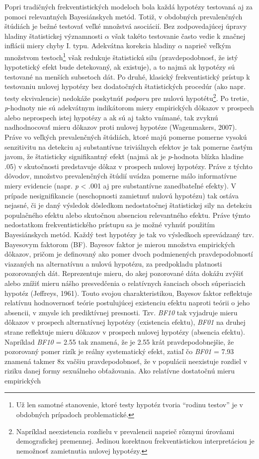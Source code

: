 \documentclass[
]{article}
\begin{document}
Popri tradičných frekventistických modeloch bola každá hypotézy testovaná aj za pomoci relevantných Bayesiánskych metód. Totiž, v obdobných prevalenčných štúdiách je bežné testovať veľké množstvá asociácií. Bez zodpovedajúcej úpravy hladiny štatistickej významnosti \(\alpha\) však takéto testovanie často vedie k značnej inflácii miery chyby I. typu. Adekvátna korekcia hladiny \(\alpha\) naprieč veľkým množstvom testoch\footnote{Už len samotné stanovenie, ktoré testy hypotéz tvoria ``rodinu testov'' je v obdobných prípadoch problematické.} však redukuje štatistickú silu (pravdepodobnosť, že istý hypotetický efekt bude detekovaný, ak existuje), a to najmä ak hypotézy sú testované na menších subsetoch dát. Po druhé, klasický frekventistický prístup k testovaniu nulovej hypotézy bez dodatočných štatistických procedúr (ako napr. testy ekvivalencie) nedokáže poskytnúť \emph{podporu} pre nulovú hypotétu\footnote{Napríklad neexistencia rozdielu v prevalencii naprieč rôznymi úrovňami demografickej premennej. Jedinou korektnou frekventistickou interpretáciou je nemožnosť zamietnutia nulovej hypotézy.}. Po tretie, \emph{p}-hodnoty nie sú adekvátnym indikátorom miery empirických dôkazov v prospech alebo neprospech istej hypotézy a ak sú aj takto vnímané, tak zvyknú nadhodnocovať mieru dôkazov proti nulovej hypotéze (Wagenmakers, 2007). Práve vo veľkých prevalenčných štúdiách, ktoré majú pomerne pomerne vysokú senzitivitu na detekciu aj substantívne triviálnych efektov je tak pomerne častým javom, že štatisticky signifikantný efekt (najmä ak je \emph{p}-hodnota blízka hladine .05) v skutočnosti predstavuje dôkaz v prospech nulovej hypotézy. Práve z týchto dôvodov, množstvo prevalenčných štúdií uvádza pomerne málo informatívne miery evidencie (napr. \emph{p} \textless{} .001 aj pre substantívne zanedbateľné efekty). V prípade nesignifikancie (neschopnosti zamietnuť nulovú hypotézu) tak ostáva nejasné, či je daný výsledok dôsledkom nedostatočnej štatistickej sily na detekciu populačného efektu alebo skutočnou absenciou relevantného efektu. Práve týmto nedostatkom frekventistického prístupu sa je možné vyhnúť použitím Bayesiánskych metód. Každý test hypotézy je tak vo výsledkoch sprevádzaný tzv. Bayesovym faktorom (BF). Bayesov faktor je mierou množstva empirických dôkazov, pričom je definovaný ako pomer dvoch podmienených pravdepodobností viazaných na alternatívnu a nulovú hypotézu, za predpokladu platnosti pozorovaných dát. Reprezentuje mieru, do akej pozorované dáta dokážu zvýšiť alebo znížiť mieru nášho presvedčenia o relatívnych šanciach oboch súperiacich hypotéz (Jeffreys, 1961). Touto svojou charakteristikou, Bayesov faktor reflektuje relatívnu hodnovernosť teórie postulujúcej existenciu efektu naproti teórii o jeho absencii, v zmysle ich prediktívnej presnosti. Tzv. \emph{BF10} tak vyjadruje mieru dôkazov v prospech alternatívnej hypotézy (existencia efektu), \emph{BF01} na druhej strane reflektuje mieru dôkazov v prospech nulovej hypotézy (absencia efektu). Napríklad \emph{BF10} = 2.55 tak znamená, že je 2.55 krát pravdepodobnejšie, že pozorovaný pomer rizík je reálny systematický efekt, zatiaľ čo \emph{BF01} = 7.93 znamená takmer 8x vačšiu pravdepodobnosť, že v populácii neexistuje rozdiel v riziku danej formy sexuálneho obťažovania. Ako relatívne dostatočnú mieru empirických 
\end{document}
